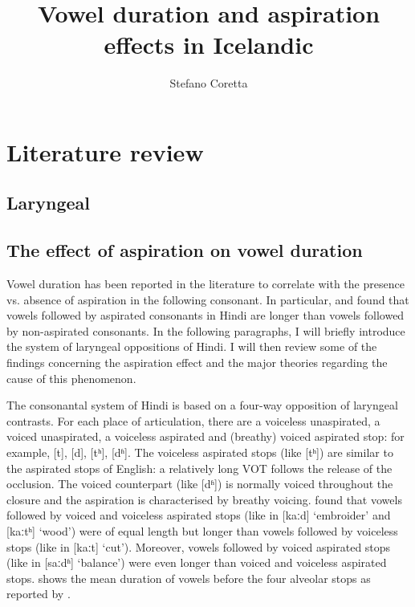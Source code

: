 \documentclass[11pt,a4paper,openany]{memoir}\usepackage[]{graphicx}\usepackage[]{color}
\title{Vowel duration and aspiration effects in Icelandic}
\author{Stefano Coretta}
\begin{document}
\frontmatter

\begin{titlingpage}
\maketitle
\end{titlingpage}

\tableofcontents*





\mainmatter



\chapter{Literature review}
\label{c:review}

\section{Laryngeal}



\section{The effect of aspiration on vowel duration}
\label{s:aspiration}

Vowel duration has been reported in the literature to correlate with the presence vs. absence of aspiration in the following consonant.
In particular, \citet{maddieson1976} and \citet{durvasula2012} found that vowels followed by aspirated consonants in Hindi are longer than vowels followed by non-aspirated consonants.
In the following paragraphs, I will briefly introduce the system of laryngeal oppositions of Hindi.
I will then review some of the findings concerning the aspiration effect and the major theories regarding the cause of this phenomenon.

The consonantal system of Hindi is based on a four-way opposition of laryngeal contrasts.
For each place of articulation, there are a voiceless unaspirated, a voiced unaspirated, a voiceless aspirated and (breathy) voiced aspirated stop: for example, [t], [d], [tʰ], [dʱ].
The voiceless aspirated stops (like [tʰ]) are similar to the aspirated stops of English: a relatively long VOT follows the release of the occlusion.
The voiced counterpart (like [dʱ]) is normally voiced throughout the closure and the aspiration is characterised by breathy voicing.
\citet{maddieson1976} found that vowels followed by voiced and voiceless aspirated stops (like in [kaːd] `embroider' and [kaːtʰ] `wood') were of equal length but longer than vowels followed by voiceless stops (like in [kaːt] `cut').
Moreover, vowels followed by voiced aspirated stops (like in [saːdʱ] `balance') were even longer than voiced and voiceless aspirated stops.
 shows the mean duration of vowels before the four alveolar stops as reported by \citet[47]{maddieson1976}.
\end{document}
